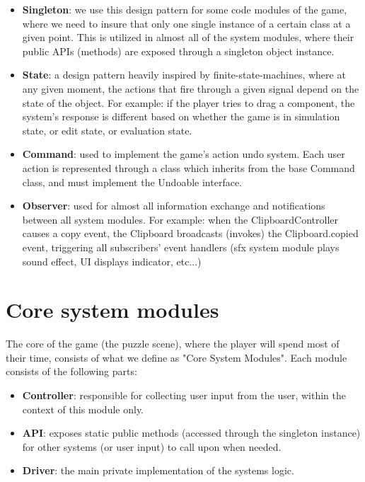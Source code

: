 \documentclass[../main.tex]{subfiles}
\begin{document}
\begin{itemize}
    \item \textbf{Singleton}: we use this design pattern for some code modules of the game, where we need to insure that only one single instance of a certain class at a given point. This is utilized in almost all of the system modules, where their public APIs (methods) are exposed through a singleton object instance.
    \item \textbf{State}: a design pattern heavily inspired by finite-state-machines, where at any given moment, the actions that fire through a given signal depend on the state of the object. For example: if the player tries to drag a component, the system's response is different based on whether the game is in simulation state, or edit state, or evaluation state.
    \item \textbf{Command}: used to implement the game's action undo system. Each user action is represented through a class which inherits from the base Command class, and must implement the Undoable interface.
    \item \textbf{Observer}: used for almost all information exchange and notifications between all system modules. For example: when the ClipboardController causes a copy event, the Clipboard broadcasts (invokes) the Clipboard.copied event, triggering all subscribers' event handlers (\acrshort{sfx} system module plays sound effect, \acrshort{UI} displays indicator, etc...) 
\end{itemize}

\section{Core system modules}
The core of the game (the puzzle scene), where the player will spend most of their time, consists of what we define as "Core System Modules". Each module consists of the following parts:
\begin{itemize}
    \item \textbf{Controller}: responsible for collecting user input from the user, within the context of this module only. 
    \item \textbf{API}: exposes static public methods (accessed through the singleton instance) for other systems (or user input) to call upon when needed.
    \item \textbf{Driver}: the main private implementation of the systems logic. 
\end{itemize}
\end{document}
